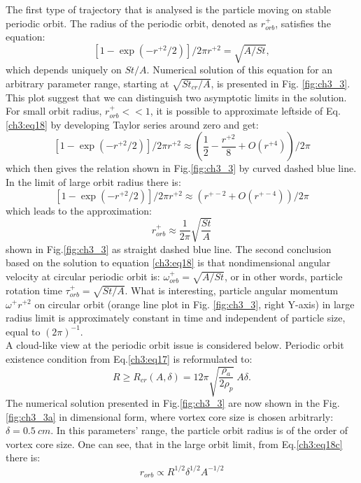\documentclass[../main.tex]{subfiles}
\begin{document}
The first type of trajectory that is analysed is the particle moving on stable periodic orbit. The radius of the periodic orbit, denoted as $r^+_{orb}$, satisfies the equation:
\begin{equation}
 \left[1-\exp\left( -r^{+ 2}/2 \right) \right]/2 \pi r^{+ 2}=\sqrt{A/St}, 
\label{ch3:eq18}
\end{equation}
which depends uniquely on $St/A$. Numerical solution of this equation for an arbitrary parameter range, starting at $\sqrt{St_{cr}/A}$, is presented in Fig. \ref{fig:ch3_3}. This plot suggest that we can distinguish two asymptotic limits in the solution. For small orbit radius, $r^+_{orb}<<1$, it is possible to approximate leftside of Eq.\ref{ch3:eq18} by developing Taylor series around zero and get:
\begin{equation}
 \left[1-\exp\left( -r^{+ 2}/2 \right) \right]/2 \pi r^{+ 2}\approx \left(\frac{1}{2}-\frac{r^{+ 2}}{8}+O(r^{+ 4})\right)/2 \pi
\label{ch3:eq18a}
\end{equation}
which then gives the relation shown in Fig.\ref{fig:ch3_3} by curved dashed blue line. In the limit of large orbit radius there is:
\begin{equation}
 \left[1-\exp\left( -r^{+ 2}/2 \right) \right]/2 \pi r^{+ 2}\approx \left(r^{+ -2}+O(r^{+ -4})\right) /2 \pi
\label{ch3:eq18b}
\end{equation}
which leads to the approximation:
\begin{equation}
r^+_{orb} \approx \frac{1}{2\pi} \sqrt{\frac{St}{A}}
\label{ch3:eq18c}
\end{equation}
shown in Fig.\ref{fig:ch3_3} as straight dashed blue line.
The second conclusion based on the solution to equation \ref{ch3:eq18} is that nondimensional angular velocity at circular periodic orbit is: $\omega^{+}_{orb}=\sqrt{A/St}$, or in other words, particle rotation time $\tau^+_{orb}=\sqrt{St/A}$. What is interesting, particle angular momentum $\omega^{+} r^{+ 2}$ on circular orbit (orange line plot in Fig. \ref{fig:ch3_3}, right Y-axis) in large radius limit is approximately constant in time and independent of particle size, equal to $(2 \pi)^{-1}$. \\
A cloud-like view at the periodic orbit issue is considered below. Periodic orbit existence condition from Eq.\ref{ch3:eq17} is reformulated to:
\begin{equation}
R \geq R_{cr}(A,\delta)=12 \pi \sqrt{\frac{\rho_a}{2\rho_p}}\  A \delta.
\label{ch3:eq19}
\end{equation}
The numerical solution presented in Fig.\ref{fig:ch3_3} are now shown in the Fig. \ref{fig:ch3_3a} in dimensional form, where vortex core size is chosen arbitrarly: $\delta=0.5~cm$. In this parameters' range, the particle orbit radius is of the order of vortex core size. One can see, that in the large orbit limit, from Eq.\ref {ch3:eq18c} there is:
\begin{equation}
r_{orb}\propto R^{1/2} \delta^{1/2} A^{-1/2}
\label{ch3:eq19b}
\end{equation}
\end{document}
